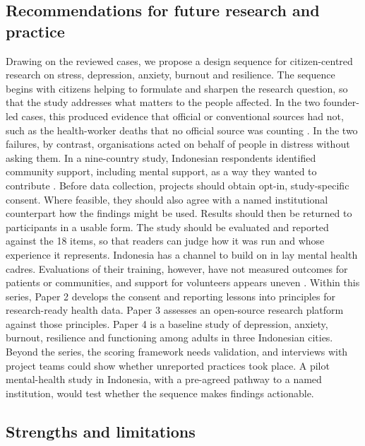 \documentclass[
  number,
  preprint]{elsarticle}
\begin{document}
\subsection{Recommendations for future research and
practice}\label{recommendations-for-future-research-and-practice}

Drawing on the reviewed cases, we propose a design sequence for
citizen-centred research on stress, depression, anxiety, burnout and
resilience. The sequence begins with citizens helping to formulate and
sharpen the research question, so that the study addresses what matters
to the people affected. In the two founder-led cases, this produced
evidence that official or conventional sources had not, such as the
health-worker deaths that no official source was counting
\citep{ekawati2022}. In the two failures, by contrast, organisations
acted on behalf of people in distress without asking them. In a
nine-country study, Indonesian respondents identified community support,
including mental support, as a way they wanted to contribute
\citep{tan2024}. Before data collection, projects should obtain opt-in,
study-specific consent. Where feasible, they should also agree with a
named institutional counterpart how the findings might be used. Results
should then be returned to participants in a usable form. The study
should be evaluated and reported against the 18 items, so that readers
can judge how it was run and whose experience it represents. Indonesia
has a channel to build on in lay mental health cadres. Evaluations of
their training, however, have not measured outcomes for patients or
communities, and support for volunteers appears uneven
\citep{susanti2024, sitorukmi2025}. Within this series, Paper 2 develops
the consent and reporting lessons into principles for research-ready
health data. Paper 3 assesses an open-source research platform against
those principles. Paper 4 is a baseline study of depression, anxiety,
burnout, resilience and functioning among adults in three Indonesian
cities. Beyond the series, the scoring framework needs validation, and
interviews with project teams could show whether unreported practices
took place. A pilot mental-health study in Indonesia, with a pre-agreed
pathway to a named institution, would test whether the sequence makes
findings actionable.

\subsection{Strengths and limitations}\label{strengths-and-limitations}
\end{document}
